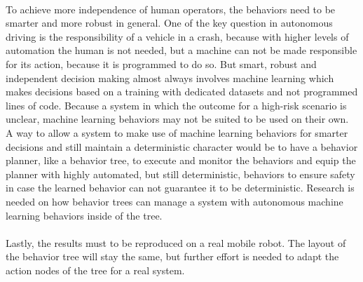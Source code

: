 \paragraph*{}

To achieve more independence of human operators, the behaviors need to be smarter and more robust in general. One of the key question in autonomous driving is the responsibility of a vehicle in a crash, because with higher levels of automation the human is not needed, but a machine can not be made responsible for its action, because it is programmed to do so. But smart, robust and independent decision making almost always involves machine learning which makes decisions based on a training with dedicated datasets and not programmed lines of code. Because a system in which the outcome for a high-risk scenario is unclear, machine learning behaviors may not be suited to be used on their own. A way to allow a system to make use of machine learning behaviors for smarter decisions and still maintain a deterministic character would be to have a behavior planner, like a behavior tree, to execute and monitor the behaviors and equip the planner with highly automated, but still deterministic, behaviors to ensure safety in case the learned behavior can not guarantee it to be deterministic. Research is needed on how behavior trees can manage a system with autonomous machine learning behaviors inside of the tree.

\paragraph*{}

Lastly, the results must to be reproduced on a real mobile robot. The layout of the behavior tree will stay the same, but further effort is needed to adapt the action nodes of the tree for a real system. 















